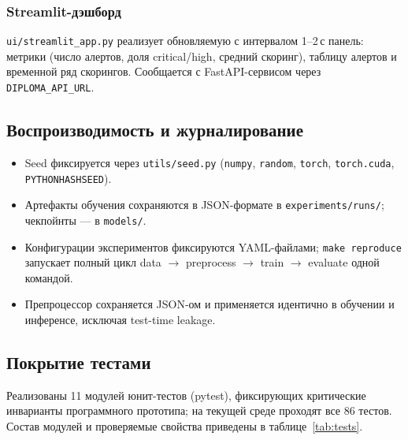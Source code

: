\subsubsection{Streamlit-дэшборд}

\texttt{ui/streamlit\_app.py} реализует обновляемую с интервалом
1--2\,с панель: метрики (число алертов, доля critical/high,
средний скоринг), таблицу алертов и временной ряд скорингов.
Сообщается с FastAPI-сервисом через \texttt{DIPLOMA\_API\_URL}.

\subsection{Воспроизводимость и журналирование}

\begin{itemize}
    \item Seed фиксируется через \texttt{utils/seed.py}
    (\texttt{numpy}, \texttt{random}, \texttt{torch},
    \texttt{torch.cuda}, \texttt{PYTHONHASHSEED}).
    \item Артефакты обучения сохраняются в JSON-формате в
    \texttt{experiments/runs/}; чекпойнты --- в \texttt{models/}.
    \item Конфигурации экспериментов фиксируются YAML-файлами;
    \texttt{make reproduce} запускает полный цикл
    data $\to$ preprocess $\to$ train $\to$ evaluate одной
    командой.
    \item Препроцессор сохраняется JSON-ом и применяется идентично
    в обучении и инференсе, исключая test-time leakage.
\end{itemize}

\subsection{Покрытие тестами}

Реализованы 11 модулей юнит-тестов (pytest), фиксирующих
критические инварианты программного прототипа; на текущей среде
проходят все 86 тестов. Состав модулей и проверяемые свойства
приведены в таблице~\ref{tab:tests}.

